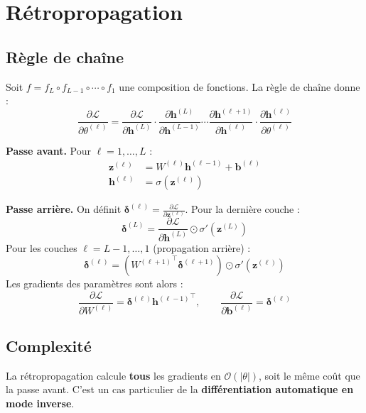 \section{R\'etropropagation}
\label{sec:backprop}

\subsection{R\`egle de cha\^ine}

Soit $f = f_L \circ f_{L-1} \circ \cdots \circ f_1$ une composition de fonctions. La r\`egle de cha\^ine donne :
\[
\frac{\partial \mathcal{L}}{\partial \theta^{(\ell)}} = \frac{\partial \mathcal{L}}{\partial \bm{h}^{(L)}} \cdot \frac{\partial \bm{h}^{(L)}}{\partial \bm{h}^{(L-1)}} \cdots \frac{\partial \bm{h}^{(\ell+1)}}{\partial \bm{h}^{(\ell)}} \cdot \frac{\partial \bm{h}^{(\ell)}}{\partial \theta^{(\ell)}}
\]

\begin{mathbox}[title=\textbf{D\'erivation de la r\'etropropagation pour un MLP}]
\textbf{Passe avant.} Pour $\ell = 1, \ldots, L$ :
\begin{align*}
\bm{z}^{(\ell)} &= W^{(\ell)} \bm{h}^{(\ell-1)} + \bm{b}^{(\ell)} \\
\bm{h}^{(\ell)} &= \sigma(\bm{z}^{(\ell)})
\end{align*}

\textbf{Passe arri\`ere.} On d\'efinit $\bm{\delta}^{(\ell)} = \frac{\partial \mathcal{L}}{\partial \bm{z}^{(\ell)}}$. Pour la derni\`ere couche :
\[
\bm{\delta}^{(L)} = \frac{\partial \mathcal{L}}{\partial \bm{h}^{(L)}} \odot \sigma'(\bm{z}^{(L)})
\]
Pour les couches $\ell = L-1, \ldots, 1$ (propagation arri\`ere) :
\[
\bm{\delta}^{(\ell)} = \left({W^{(\ell+1)}}^\top \bm{\delta}^{(\ell+1)}\right) \odot \sigma'(\bm{z}^{(\ell)})
\]
Les gradients des param\`etres sont alors :
\[
\frac{\partial \mathcal{L}}{\partial W^{(\ell)}} = \bm{\delta}^{(\ell)} {\bm{h}^{(\ell-1)}}^\top, \qquad \frac{\partial \mathcal{L}}{\partial \bm{b}^{(\ell)}} = \bm{\delta}^{(\ell)}
\]
\end{mathbox}

\subsection{Complexit\'e}

\begin{proposition}
La r\'etropropagation calcule \textbf{tous} les gradients en $\mathcal{O}(|\theta|)$, soit le m\^eme co\^ut que la passe avant. C'est un cas particulier de la \textbf{diff\'erentiation automatique en mode inverse}.
\end{proposition}

